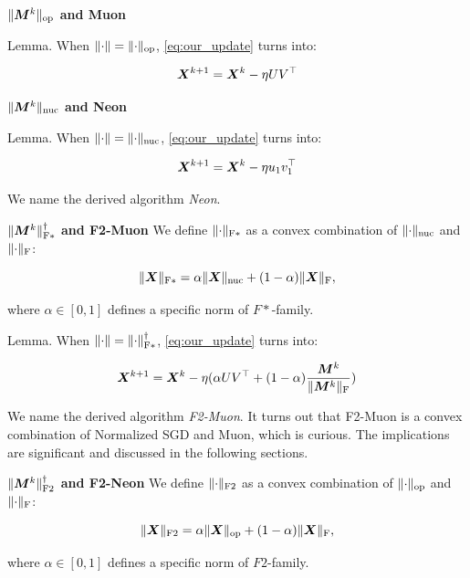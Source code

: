 \documentclass{article} %
\newcommand{\norm}[1]{\lVert #1\rVert}
\DeclarePairedDelimiter{\normf}{\|}{\|_\mathrm{F}}
\DeclarePairedDelimiter{\normfstar}{\|}{\|_\mathrm{F*}}
\DeclarePairedDelimiter{\normftwo}{\|}{\|_\mathrm{F2}}
\DeclarePairedDelimiter{\norms}{\|}{\|_{\mathrm{op}}}
\DeclarePairedDelimiter{\normn}{\|}{\|_{\mathrm{nuc}}}
\begin{document}
{\bf $\norms{\mM^{k}}$ and Muon}

Lemma. When $\norm{\cdot} = \norms{\cdot}$, \cref{eq:our_update} turns into:

\begin{equation}\label{eq:muon_update}
    {\bm{X}}^{k+1} = {\bm{X}}^{k} - \eta U V^\top
\end{equation}

{\bf $\normn{\mM^{k}}$ and Neon}

Lemma. When $\norm{\cdot} = \normn{\cdot}$, \cref{eq:our_update} turns into:

\begin{equation}\label{eq:neon_update}
    {\bm{X}}^{k+1} = {\bm{X}}^{k} - \eta u_1 v_1^\top
\end{equation}

We name the derived algorithm \emph{Neon}. 

{\bf $\normfstar{\mM^{k}}^\dagger$ and F2-Muon}
We define $\normfstar{\cdot}$ as a convex combination of $\normn{\cdot}$ and $\normf{\cdot}$:

\begin{equation}\label{eq:fstar_norm}
    \normfstar{\mX} = \alpha \normn{\mX} + (1-\alpha)\normf{\mX},
\end{equation}

where $\alpha \in [0, 1]$ defines a specific norm of $F*$-family.

Lemma. When $\norm{\cdot} = \normfstar{\cdot}^\dagger$, \cref{eq:our_update} turns into:

\begin{equation}\label{eq:nsgd_muon_update}
    \mX^{k+1} = \mX^{k} - \eta (\alpha U V^\top + (1-\alpha)\frac{\mM^k}{\normf{\mM^k}})
\end{equation}

We name the derived algorithm \emph{F2-Muon}. It turns out that F2-Muon is a convex combination of Normalized SGD and Muon, which is curious. The implications are significant and discussed in the following sections.

{\bf $\normftwo{\mM^{k}}^\dagger$ and F2-Neon}
We define $\normftwo{\cdot}$ as a convex combination of $\norms{\cdot}$ and $\normf{\cdot}$:

\begin{equation}\label{eq:ftwo_norm}
    \normftwo{\mX} = \alpha \norms{\mX} + (1-\alpha)\normf{\mX},
\end{equation}

where $\alpha \in [0, 1]$ defines a specific norm of $F2$-family.
\end{document}
